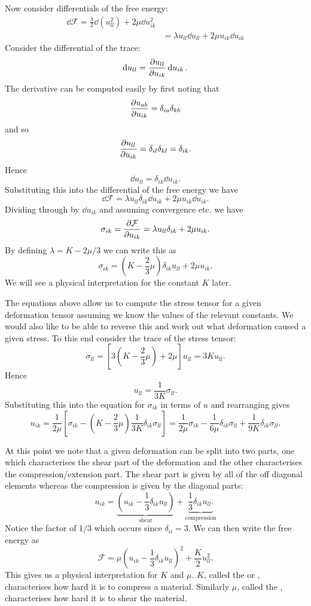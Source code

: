 \documentclass[a4paper]{article}
\newcommand{\freeEnergy}{\mathcal{F}}
\begin{document}
    Now consider differentials of the free energy:
    \begin{align*}
        \dd{\freeEnergy} = \frac{\lambda}{2}\dd{(u_{ll}^2)} + 2\mu\dd{u_{ik}^2}\\
        &= \lambda u_{ll}\dd{u_{ll}} + 2\mu u_{ik}\dd{u_{ik}}
    \end{align*}
    Consider the differential of the trace:
    \[\dd{u_{ll}} = \pdv{u_{ll}}{u_{ik}}\dd{u_{ik}}.\]
    The derivative can be computed easily by first noting that
    \[\pdv{u_{ab}}{u_{ik}} = \delta_{ia}\delta_{kb}\]
    and so
    \[\pdv{u_{ll}}{u_{ik}} = \delta_{il}\delta_{kl} = \delta_{ik}.\]
    Hence
    \[\dd{u_{ll}} = \delta_{ik}\dd{u_{ik}}.\]
    Substituting this into the differential of the free energy we have
    \[\dd{\freeEnergy} = \lambda u_{ll}\delta_{ik}\dd{u_{ik}} + 2\mu u_{ik}\dd{u_{ik}}.\]
    Dividing through by \(\dd{u_{ik}}\) and assuming convergence etc. we have
    \[\sigma_{ik} = \pdv{\freeEnergy}{u_{ik}} = \lambda u_{ll}\delta_{ik} + 2\mu u_{ik}.\]
    By defining \(\lambda = K - 2\mu/3\) we can write this as
    \[\sigma_{ik} = \left( K - \frac{2}{3}\mu \right)\delta_{ik}u_{ll} + 2\mu u_{ik}.\]
    We will see a physical interpretation for the constant \(K\) later.
    
    The equations above allow us to compute the stress tensor for a given deformation tensor assuming we know the values of the relevant constants.
    We would also like to be able to reverse this and work out what deformation caused a given stress.
    To this end consider the trace of the stress tensor:
    \[\sigma_{ll} = \left[ 3\left( K - \frac{2}{3}\mu \right) + 2\mu \right] u_{ll} = 3Ku_{ll}.\]
    Hence
    \[u_{ll} = \frac{1}{3K}\sigma_{ll}.\]
    Substituting this into the equation for \(\sigma_{ik}\) in terms of \(u\) and rearranging gives
    \[u_{ik} = \frac{1}{2\mu}\left[ \sigma_{ik} - \left( K - \frac{2}{3}\mu \right) \frac{1}{3K} \delta_{ik} \sigma_{ll} \right] = \frac{1}{2\mu}\sigma_{ik} - \frac{1}{6\mu}\delta_{ik}\sigma_{ll} + \frac{1}{9K}\delta_{ik}\sigma_{ll}.\]
    
    At this point we note that a given deformation can be split into two parts, one which characterises the shear part of the deformation and the other characterises the compression/extension part.
    The shear part is given by all of the off diagonal elements whereas the compression is given by the diagonal parts:
    \[u_{ik} = \underbrace{\left( u_{ik} - \frac{1}{3}\delta_{ik}u_{ll} \right)}_{\text{shear}} + \underbrace{\frac{1}{3}\delta_{ik}u_{ll}.}_{\text{compression}}\]
    Notice the factor of \(1/3\) which occurs since \(\delta_{ii} = 3\).
    We can then write the free energy as
    \[\freeEnergy = \mu\left( u_{ik} - \frac{1}{3}\delta_{ik}u_{ll} \right)^2 + \frac{K}{2}u_{ll}^2.\]
    This gives us a physical interpretation for \(K\) and \(\mu\).
    \(K\), called the  or , characterises how hard it is to compress a material.
    Similarly \(\mu\), called the , characterises how hard it is to shear the material.
    
\end{document}
